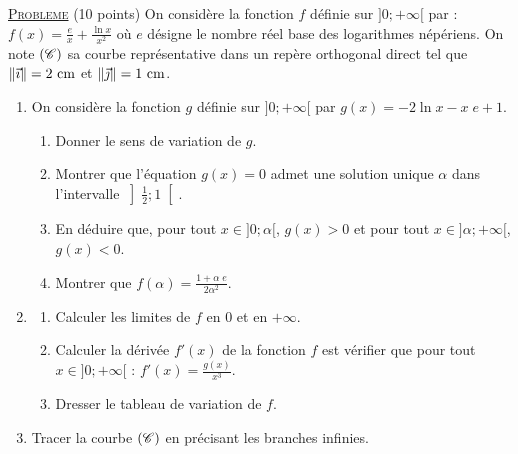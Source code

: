 \noindent \underline{\textsc{Probleme}} (10 points) \newline
      On consid\`ere la fonction $f$ d\'efinie sur $]0;+\infty[$ par : 
      $f(x) = \frac{e}{x} + \frac{\ln x}{x^2}$ o\`u $e$ d\'esigne le nombre r\'eel base des logarithmes n\'ep\'eriens.
      On note $(\mathscr{C})$ sa courbe repr\'esentative dans un rep\`ere orthogonal direct \Oij{} tel que 
      $\| \vec{\imath} \| = 2 ~\mathrm{cm} $ et $\| \vec{\jmath} \| = 1 ~\mathrm{cm}$.
      \begin{enumerate}
            \item On consid\`ere la fonction $g$ d\'efinie sur $]0;+\infty[$ par $g(x) = - 2 \ln x - x \; e + 1$.
                  \begin{enumerate}
                        \item Donner le sens de variation de $g$.
                        \item Montrer que l'\'equation $g(x) = 0$ admet une solution unique $\alpha$ dans l'intervalle
                              $\left] \frac{1}{2} ; 1 \right[$.
                        \item En d\'eduire que, pour tout $x \in ]0;\alpha[$, $g(x) > 0$ et pour tout 
                              $x \in ]\alpha ; +\infty[$, $g(x) < 0$.
                        \item Montrer que $f(\alpha) = \frac{1 + \alpha\; e}{2 \alpha^2}$.
                  \end{enumerate}
            \item \begin{enumerate}
                        \item Calculer les limites de $f$ en $0$ et en $+\infty$.
                        \item Calculer la d\'eriv\'ee $f'(x)$ de la fonction $f$ est v\'erifier que pour tout 
                              $x \in ]0 ; +\infty[$ : $f'(x) = \frac{g(x)}{x^3}$.
                        \item Dresser le tableau de variation de $f$.
                  \end{enumerate}
            \item Tracer la courbe $(\mathscr{C})$ en pr\'ecisant les branches infinies. \newline

\end{enumerate}
